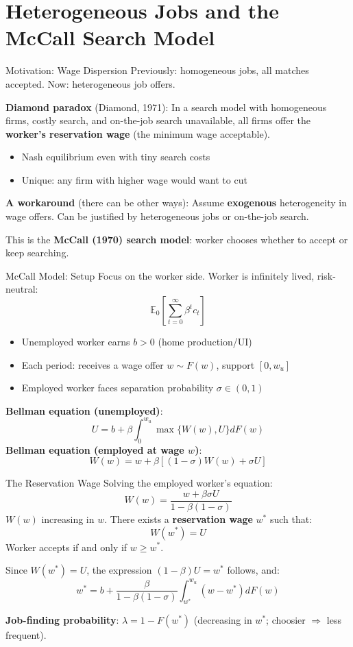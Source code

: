 \documentclass[blue]{beamer}
\newcommand{\E}{\mathbb{E}}
\begin{document}
	\section{Heterogeneous Jobs and the McCall Search Model}
	
	\begin{frame}{Motivation: Wage Dispersion}
		Previously: homogeneous jobs, all matches accepted. Now: heterogeneous job offers.
		
		\textbf{Diamond paradox} (Diamond, 1971): In a search model with homogeneous firms, costly search, and on-the-job search unavailable, all firms offer the \textbf{worker's reservation wage} (the minimum wage acceptable).
		\begin{itemize}
			\item Nash equilibrium even with tiny search costs
			\item Unique: any firm with higher wage would want to cut
		\end{itemize}
		\textbf{A workaround} (there can be other ways): Assume \textbf{exogenous} heterogeneity in wage offers. Can be justified by heterogeneous jobs or on-the-job search.
		
		\bigskip
		This is the \textbf{McCall (1970) search model}: worker chooses whether to accept or keep searching.
	\end{frame}
	
	\begin{frame}{McCall Model: Setup}
		Focus on the worker side. Worker is infinitely lived, risk-neutral:
		\[
		\E_0 \!\left[\sum_{t=0}^\infty \beta^t c_t\right]
		\]
		\begin{itemize}
			\item Unemployed worker earns $b > 0$ (home production/UI)
			\item Each period: receives a wage offer $w \sim F(w)$, support $[0, w_u]$
			\item Employed worker faces separation probability $\sigma \in (0, 1)$
		\end{itemize}
		
		\textbf{Bellman equation (unemployed)}:
		\[
		U = b + \beta \int_0^{w_u} \max\{W(w), U\} dF(w)
		\]
		\textbf{Bellman equation (employed at wage $w$)}:
		\[
		W(w) = w + \beta[(1 - \sigma) W(w) + \sigma U]
		\]
	\end{frame}
	\begin{frame}{The Reservation Wage}
		Solving the employed worker's equation:
		\[
		W(w) = \frac{w + \beta \sigma U}{1 - \beta(1 - \sigma)}
		\]
		$W(w)$ increasing in $w$. There exists a \textbf{reservation wage} $w^*$ such that:
		\[
		W(w^*) = U
		\]
		Worker accepts if and only if $w \geq w^*$.
		
		\bigskip
		Since $W(w^*) = U$, the expression $(1 - \beta) U = w^*$ follows, and:
		\[
		{w^* = b + \frac{\beta}{1 - \beta(1 - \sigma)} \int_{w^*}^{w_u} (w - w^*) dF(w)}
		\]
	
		\textbf{Job-finding probability}: $\lambda = 1 - F(w^*)$ (decreasing in $w^*$; choosier $\Rightarrow$ less frequent).
	\end{frame}
	
\end{document}
